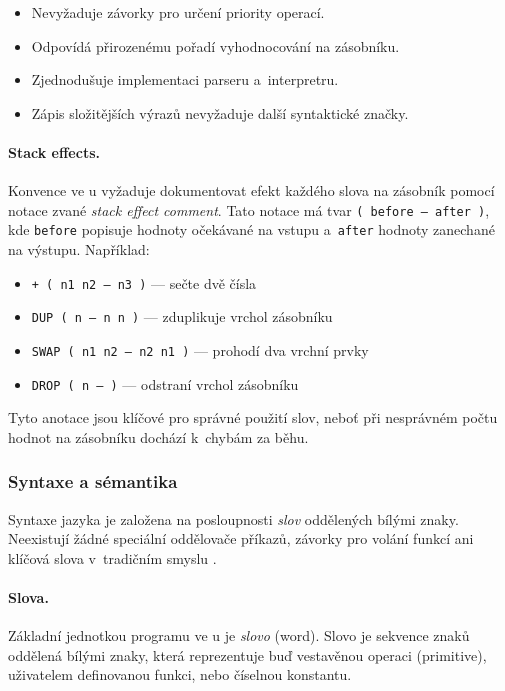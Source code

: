 \begin{itemize}
	\item Nevyžaduje závorky pro určení priority operací.
	\item Odpovídá přirozenému pořadí vyhodnocování na zásobníku.
	\item Zjednodušuje implementaci parseru a~interpretru.
	\item Zápis složitějších výrazů nevyžaduje další syntaktické značky.
\end{itemize}

\paragraph{Stack effects.}
Konvence ve \Forth{}u vyžaduje dokumentovat efekt každého slova
na zásobník pomocí notace zvané \emph{stack effect comment}.
Tato notace má tvar \texttt{( before -- after )}, kde \texttt{before}
popisuje hodnoty očekávané na vstupu a~\texttt{after} hodnoty
zanechané na výstupu. Například:

\begin{itemize}
	\item \texttt{+ ( n1 n2 -- n3 )} --- sečte dvě čísla
	\item \texttt{DUP ( n -- n n )} --- zduplikuje vrchol zásobníku
	\item \texttt{SWAP ( n1 n2 -- n2 n1 )} --- prohodí dva vrchní prvky
	\item \texttt{DROP ( n -- )} --- odstraní vrchol zásobníku
\end{itemize}

Tyto anotace jsou klíčové pro správné použití slov, neboť při
nesprávném počtu hodnot na zásobníku dochází k~chybám za běhu.


\subsubsection{Syntaxe a sémantika}
\label{sec:forth-syntax}

Syntaxe jazyka \Forth{} je založena na posloupnosti \emph{slov}
oddělených bílými znaky. Neexistují
žádné speciální oddělovače příkazů, závorky pro volání funkcí
ani klíčová slova v~tradičním smyslu \autocite{brodie1981}.

\paragraph{Slova.}
Základní jednotkou programu ve \Forth{}u je \emph{slovo} (word).
Slovo je sekvence znaků oddělená bílými znaky, která reprezentuje
buď vestavěnou operaci (primitive), uživatelem definovanou funkci,
nebo číselnou konstantu.

